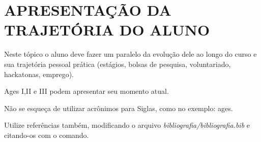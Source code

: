 \chapter[APRESENTAÇÃO DA TRAJETÓRIA DO ALUNO]{APRESENTAÇÃO DA TRAJETÓRIA DO ALUNO}

Neste tópico o aluno deve fazer um paralelo da evolução dele ao longo do curso e sua trajetória pessoal prática (estágios, bolsas de pesquisa, voluntariado, hackatonas, emprego).

Ages I,II e III podem apresentar seu momento atual.

Não se esqueça de utilizar acrônimos para Siglas, como no exemplo: \ac{ages}.

Utilize referências também, modificando o arquivo \textit{bibliografia/bibliografia.bib} e citando-os com o comando\cite{artigo}.
